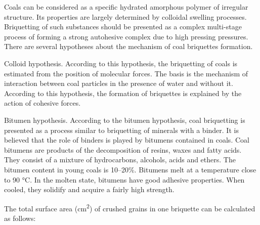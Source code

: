 Coals can be considered as a specific hydrated amorphous polymer of
irregular structure. Its properties are largely determined by colloidal
swelling processes. Briquetting of such substances should be presented
as a complex multi-stage process of forming a strong autohesive complex
due to high pressing pressures. There are several hypotheses about the
mechanism of coal briquettes formation.

Colloid hypothesis. According to this hypothesis, the briquetting of
coals is estimated from the position of molecular forces. The basis is
the mechanism of interaction between coal particles in the presence of
water and without it. According to this hypothesis, the formation of
briquettes is explained by the action of cohesive forces.

Bitumen hypothesis. According to the bitumen hypothesis, coal
briquetting is presented as a process similar to briquetting of minerals
with a binder. It is believed that the role of binders is played by
bitumens contained in coals. Coal bitumens are products of the
decomposition of resins, waxes and fatty acids. They consist of a
mixture of hydrocarbons, alcohols, acids and ethers. The bitumen content
in young coals is 10--20\%. Bitumens melt at a temperature close to 90
°C. In the molten state, bitumens have good adhesive properties. When
cooled, they solidify and acquire a fairly high strength.

The total surface area (cm\textsuperscript{2}) of crushed grains in one
briquette can be calculated as follows:


